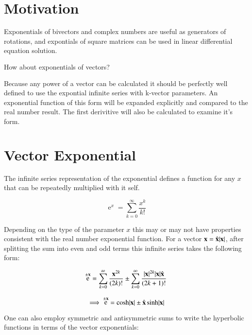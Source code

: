 \documentclass{article}      %
\title{} %
\author{Peeter Joot}         %
\DeclareMathOperator{\Exp}{e}
\begin{document}

\maketitle{}

\section{ Motivation }

Exponentials of bivectors and complex numbers are useful as generators of rotations, and expontials of
square matrices can be used in linear differential equation solution.

How about exponentials of vectors?

Because any power of a vector can be calculated it should be perfectly well defined to use the expontial infinite series with k-vector parameters.  An 
exponential function of this form will be expanded explicitly and compared to the real number result.  The first
derivitive will also be calculated to examine it's form.

\section{ Vector Exponential }

The infinite series representation of the exponential defines a function for any $x$ that can be repeatedly multiplied
with it self.

\begin{equation}
\Exp^x = \sum_{k=0}^{\infty} \frac{x^k}{k!}
\end{equation}

Depending on the type of the parameter $x$ this may or may not have properties consistent with
the real number exponential function.
For a vector $\mathbf{x} = \hat{\mathbf{x}}\lvert{\mathbf{x}}\rvert$, after splitting the sum into even and odd terms this infinite series takes the
following form:

\begin{equation*}
\Exp^{\pm\Bx}
= 
\sum_{k=0}^{\infty} \frac{\Bx^{2k}}{(2k)!}
\pm
\sum_{k=0}^{\infty} \frac{\abs{\Bx}^{2k}\abs{\Bx}\xcap}{(2k+1)!} 
\end{equation*}

\begin{equation}
\implies
\Exp^{\pm\Bx}
= 
\cosh\abs{\Bx}
\pm
\xcap \sinh\abs{\Bx}
\end{equation}

One can also employ symmetric and antisymmetric sums to write the hyperbolic functions in terms of the
vector exponentials:
\end{document}
